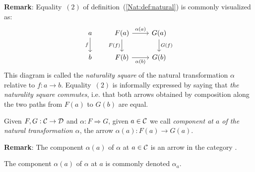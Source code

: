\noindent
{\bf Remark}: Equality~$(2)$ of definition~(\ref{Nat:def:natural}) is commonly
visualized as: 
    \[
        \begin{tikzcd}
            a\arrow[d,swap, "f"]
            &F(a)\arrow[r, "\alpha(a)"]\arrow[d, swap,"F(f)"]
            &G(a)\arrow[d, "G(f)"]
            \\
            b
            &F(b)\arrow[r, swap, "\alpha(b)"]
            &G(b)
        \end{tikzcd}
    \]
This diagram is called the {\em naturality square} of the
natural transformation $\alpha$ relative to $f:a \to b$. Equality~$(2)$
is informally expressed by saying that {\em the naturality square commutes},
i.e. that both arrows obtained by composition along the two paths from $F(a)$ 
to $G(b)$ are equal. 

\begin{defin}\label{Nat:def:natural:component}
    Given $F,G:\mbox{$\cal C$}\to\mbox{$\cal D$}$ and $\alpha:F\Rightarrow G$, given $a\in\mbox{$\cal C$}$
    we call {\em component at $a$ of the natural transformation $\alpha$},
    the arrow $\alpha(a):F(a)\to G(a)$.
\end{defin}

\noindent
{\bf Remark}: The component $\alpha(a)$ of $\alpha$ at $a\in\mbox{$\cal C$}$ is an arrow 
in the category \Dat.

\begin{notation}\label{Nat:notation:natural:component}
    The component $\alpha(a)$ of $\alpha$ at $a$ is commonly denoted $\alpha_{a}$.
\end{notation}


